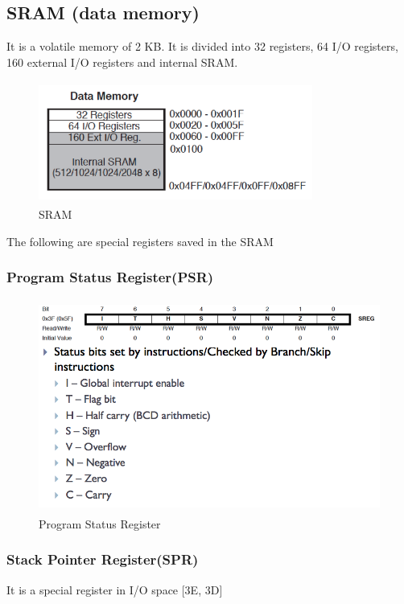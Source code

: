 \subsection{SRAM (data memory)}
It is a volatile memory of 2 KB. It is divided into 32 registers, 64 I/O registers, 160 external I/O registers and internal SRAM.

\begin{figure}[h!]
\centering
\includegraphics[height=4cm, width=9cm]{registers.png}
\caption{SRAM \protect\cite{WashUni:URL}}
\label{SRAM contents}
\end{figure}

\newpage

\noindent The following are special registers saved in the SRAM 

\subsubsection{Program Status Register(PSR)}

\begin{figure}[h!]
\centering
\includegraphics[height=7cm, width=12cm]{PSR.png}
\caption{Program Status Register \protect\cite{WashUni:URL}}
\label{Program Status Register}
\end{figure}

\subsubsection{Stack Pointer Register(SPR)}
It is a special register in I/O space [3E, 3D]

